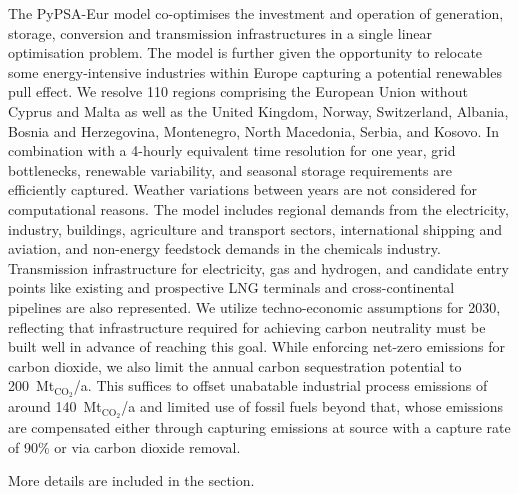 The PyPSA-Eur\cite{PyPSAEurSecSectorCoupled} model co-optimises the investment
and operation of generation, storage, conversion and transmission
infrastructures in a single linear optimisation problem. The model is further
given the opportunity to relocate some energy-intensive industries within Europe
capturing a potential renewables pull
effect.\cite{verpoortEstimatingRenewables2023,samadiRenewablesPull2023} We
resolve 110 regions comprising the European Union without Cyprus and Malta as
well as the United Kingdom, Norway, Switzerland, Albania, Bosnia and
Herzegovina, Montenegro, North Macedonia, Serbia, and Kosovo. In combination
with a 4-hourly equivalent time resolution for one year, grid bottlenecks,
renewable variability, and seasonal storage requirements are efficiently
captured. Weather variations between years are not considered for computational
reasons. The model includes regional demands from the electricity, industry,
buildings, agriculture and transport sectors, international shipping and
aviation, and non-energy feedstock demands in the chemicals industry.
Transmission infrastructure for electricity, gas and hydrogen, and candidate
entry points like existing and prospective LNG terminals and cross-continental
pipelines are also represented. We utilize techno-economic assumptions for
2030\cite{dea2019}, reflecting that infrastructure required for achieving carbon
neutrality must be built well in advance of reaching this goal. While enforcing
net-zero emissions for carbon dioxide, we also limit the annual carbon
sequestration potential to 200~Mt$_{\text{CO}_2}$/a. This suffices to offset
unabatable industrial process emissions of around 140~Mt$_{\text{CO}_2}$/a and
limited use of fossil fuels beyond that, whose emissions are compensated either
through capturing emissions at source with a capture rate of 90\% or via carbon
dioxide removal.

More details are included in the  section.
